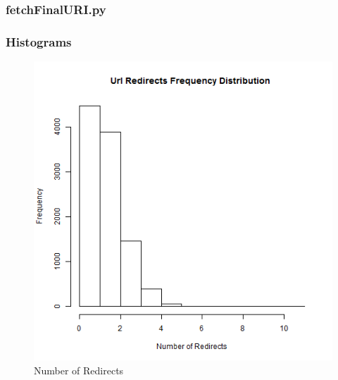 
\newpage

\subsubsection{fetchFinalURI.py}

\newpage

%

\subsubsection{Histograms}
\begin{figure}[ht]    
    \begin{center}
        \includegraphics[scale=0.60]{url-redirect-histogram.png}
        \caption{Number of Redirects}
        \label{Number of Redirects}
    \end{center}
\end{figure}

